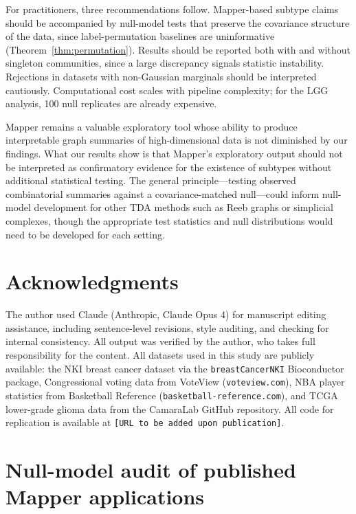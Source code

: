 \documentclass[hidelinks]{siamart251216}
\begin{document}
For practitioners, three recommendations follow.  Mapper-based
subtype claims should be accompanied by null-model tests that preserve
the covariance structure of the data, since label-permutation baselines
are uninformative (Theorem~\ref{thm:permutation}).  Results should
be reported both with and without singleton communities, since a large
discrepancy signals statistic instability.  Rejections in
datasets with non-Gaussian marginals should be interpreted cautiously.
Computational cost scales with pipeline complexity; for the LGG
analysis, 100 null replicates are already expensive.

Mapper remains a valuable exploratory tool whose ability to produce
interpretable graph summaries of high-dimensional data is not diminished
by our findings.  What our results show is that Mapper's exploratory
output should not be interpreted as confirmatory evidence for the
existence of subtypes without additional statistical testing.  The
general principle---testing observed combinatorial summaries against a
covariance-matched null---could inform null-model development for other
TDA methods such as Reeb graphs or simplicial complexes, though the
appropriate test statistics and null distributions would need to be
developed for each setting.


\section*{Acknowledgments}
The author used Claude (Anthropic, Claude Opus 4) for manuscript editing
assistance, including sentence-level revisions, style auditing, and
checking for internal consistency.  All output was verified by the
author, who takes full responsibility for the content.
All datasets used in this study are publicly available: the NKI breast
cancer dataset via the \texttt{breastCancerNKI} Bioconductor package,
Congressional voting data from VoteView (\texttt{voteview.com}), NBA
player statistics from Basketball Reference
(\texttt{basketball-reference.com}), and TCGA lower-grade glioma data
from the CamaraLab GitHub repository.  All code for replication is
available at \texttt{[URL to be added upon publication]}.



\appendix

\section{Null-model audit of published Mapper applications}\label{sm:audit}
\end{document}
